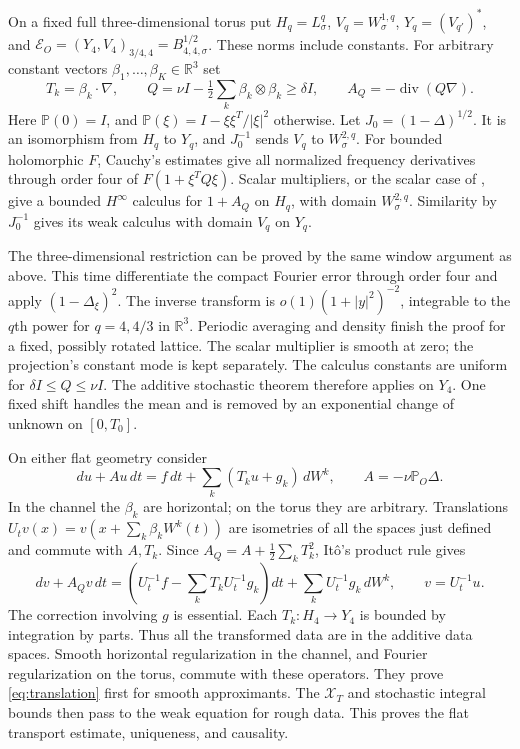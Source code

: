 \documentclass[11pt]{article}
\numberwithin{equation}{section}
\theoremstyle{remark}
\newcommand{\R}{\mathbb R}
\newcommand{\PP}{\mathbb P}
\newcommand{\divg}{\operatorname{div}}
\newcommand{\calE}{\mathcal E}
\newcommand{\calX}{\mathcal X}
\begin{document}
On a fixed full three-dimensional torus put
$H_q=L^q_\sigma$, $V_q=W^{1,q}_\sigma$, $Y_q=(V_{q'})^*$,
and $\calE_O=(Y_4,V_4)_{3/4,4}=B^{1/2}_{4,4,\sigma}$.
These norms include constants. For arbitrary constant vectors
$\beta_1,\ldots,\beta_K\in\R^3$ set
\[
 T_k=\beta_k\cdot\nabla,\qquad
 Q=\nu I-\tfrac12\sum_k\beta_k\otimes\beta_k\geq\delta I,
 \qquad A_Q=-\divg(Q\nabla).
\]
Here $\PP(0)=I$, and $\PP(\xi)=I-\xi\xi^T/|\xi|^2$ otherwise.
Let $J_0=(1-\Delta)^{1/2}$. It is an isomorphism from $H_q$ to
$Y_q$, and $J_0^{-1}$ sends $V_q$ to $W^{2,q}_\sigma$.
For bounded holomorphic $F$, Cauchy's estimates give all normalized
frequency derivatives through order four of
$F(1+\xi^TQ\xi)$. Scalar multipliers, or the scalar case of
\cite[Corollary 4.4]{GW}, give a bounded $H^\infty$ calculus for
$1+A_Q$ on $H_q$, with domain $W^{2,q}_\sigma$. Similarity by
$J_0^{-1}$ gives its weak calculus with domain $V_q$ on $Y_q$.

The three-dimensional restriction can be proved by the same window
argument as above. This time differentiate the compact Fourier error
through order four and apply $(1-\Delta_\xi)^2$. The inverse transform
is $o(1)(1+|y|^2)^{-2}$, integrable to the $q$th power for
$q=4,4/3$ in $\R^3$. Periodic averaging and density finish the proof
for a fixed, possibly rotated lattice. The scalar multiplier is smooth
at zero; the projection's constant mode is kept separately.
The calculus constants are uniform for $\delta I\leq Q\leq\nu I$.
The additive stochastic theorem therefore applies on $Y_4$.
One fixed shift handles the mean and is removed by an exponential
change of unknown on $[0,T_0]$.

On either flat geometry consider
\begin{equation}\label{eq:flat-transport}
 du+A u\,dt=f\,dt+\sum_k(T_ku+g_k)\,dW^k,
 \qquad A=-\nu\PP_O\Delta.
\end{equation}
In the channel the $\beta_k$ are horizontal; on the torus they are
arbitrary. Translations
$U_tv(x)=v(x+\sum_k\beta_kW^k(t))$ are isometries of all the
spaces just defined and commute with $A,T_k$. Since
$A_Q=A+\frac12\sum_kT_k^2$, It\^o's product rule gives
\begin{equation}\label{eq:translation}
 dv+A_Qv\,dt=
 \left(U_t^{-1}f-\sum_k T_kU_t^{-1}g_k\right)dt
 +\sum_kU_t^{-1}g_k\,dW^k,\qquad v=U_t^{-1}u.
\end{equation}
The correction involving $g$ is essential. Each $T_k:H_4\to Y_4$
is bounded by integration by parts. Thus all the transformed data
are in the additive data spaces. Smooth horizontal regularization in
the channel, and Fourier regularization on the torus, commute with
these operators. They prove \eqref{eq:translation} first for smooth
approximants. The $\calX_T$ and stochastic integral bounds then pass
to the weak equation for rough data. This proves the flat transport
estimate, uniqueness, and causality.
\end{document}
